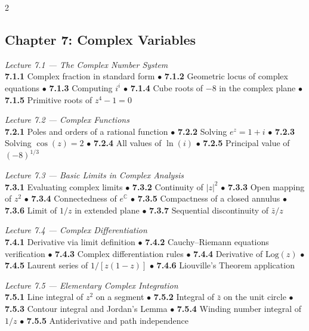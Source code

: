 \begin{multicols}{2}
\subsection*{Chapter 7: Complex Variables}

\noindent\textit{Lecture 7.1 --- The Complex Number System}\\
\textbf{7.1.1} Complex fraction in standard form \(\bullet\)
\textbf{7.1.2} Geometric locus of complex equations \(\bullet\)
\textbf{7.1.3} Computing $i^i$ \(\bullet\)
\textbf{7.1.4} Cube roots of $-8$ in the complex plane \(\bullet\)
\textbf{7.1.5} Primitive roots of $z^4 - 1 = 0$

\medskip
\noindent\textit{Lecture 7.2 --- Complex Functions}\\
\textbf{7.2.1} Poles and orders of a rational function \(\bullet\)
\textbf{7.2.2} Solving $e^z = 1 + i$ \(\bullet\)
\textbf{7.2.3} Solving $\cos(z) = 2$ \(\bullet\)
\textbf{7.2.4} All values of $\ln(i)$ \(\bullet\)
\textbf{7.2.5} Principal value of $(-8)^{1/3}$

\medskip
\noindent\textit{Lecture 7.3 --- Basic Limits in Complex Analysis}\\
\textbf{7.3.1} Evaluating complex limits \(\bullet\)
\textbf{7.3.2} Continuity of $|z|^2$ \(\bullet\)
\textbf{7.3.3} Open mapping of $z^2$ \(\bullet\)
\textbf{7.3.4} Connectedness of $e^{\mathbb{C}}$ \(\bullet\)
\textbf{7.3.5} Compactness of a closed annulus \(\bullet\)
\textbf{7.3.6} Limit of $1/z$ in extended plane \(\bullet\)
\textbf{7.3.7} Sequential discontinuity of $\bar{z}/z$

\medskip
\noindent\textit{Lecture 7.4 --- Complex Differentiation}\\
\textbf{7.4.1} Derivative via limit definition \(\bullet\)
\textbf{7.4.2} Cauchy--Riemann equations verification \(\bullet\)
\textbf{7.4.3} Complex differentiation rules \(\bullet\)
\textbf{7.4.4} Derivative of $\mathrm{Log}(z)$ \(\bullet\)
\textbf{7.4.5} Laurent series of $1/[z(1-z)]$ \(\bullet\)
\textbf{7.4.6} Liouville's Theorem application

\medskip
\noindent\textit{Lecture 7.5 --- Elementary Complex Integration}\\
\textbf{7.5.1} Line integral of $z^2$ on a segment \(\bullet\)
\textbf{7.5.2} Integral of $\bar{z}$ on the unit circle \(\bullet\)
\textbf{7.5.3} Contour integral and Jordan's Lemma \(\bullet\)
\textbf{7.5.4} Winding number integral of $1/z$ \(\bullet\)
\textbf{7.5.5} Antiderivative and path independence


\end{multicols}
